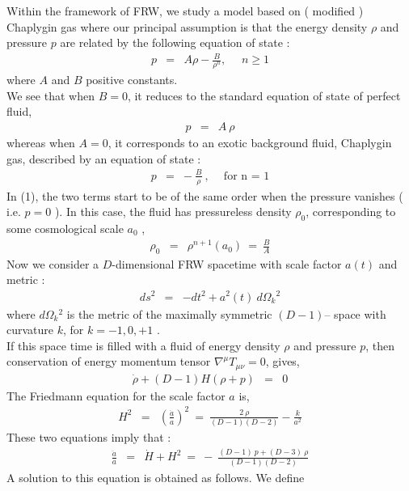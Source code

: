 \documentclass[a4paper,12pt,a4]{article}
\begin{document}
Within the framework of FRW, we study a model based on ( modified ) 
Chaplygin gas where our principal assumption is that the energy density 
$\rho$ and pressure $p$ are related by the following equation of 
state :  
\begin{eqnarray}
p & = & A \rho - \frac{B}{\rho^n} ,~~~~~~n \geq 1  
\end{eqnarray}
where  $A$ and $B$ positive constants. \\  
We see that when $B = 0$, it reduces to the standard equation of state 
of perfect fluid, 
\begin{eqnarray}
p & = & A~ \rho 
\end{eqnarray}
whereas when $A = 0$, it corresponds to an exotic background fluid, 
Chaplygin gas, described by an equation of state : 
\begin{eqnarray}
p & = & -~ \frac{B}{\rho}~,~~~~\mbox{ for n = 1} 
\end{eqnarray}
In (1), the two terms start to be of the same order when the pressure 
vanishes ( i.e. $p = 0$ ). In this case, the fluid has pressureless 
density $\rho_0$, corresponding to some cosmological scale $a_0$ , 
\begin{eqnarray}
\rho_0 & = & \rho^{n+1} ( a_0 )~=~ \frac{B}{A} 
\end{eqnarray}
Now we consider a $D$-dimensional FRW spacetime with scale factor $a(t)$ 
and metric :
\begin{eqnarray}
d s^2 & = & - d t^2 + a{^2}(t)~ d \Omega_k{^2}
\end{eqnarray} 
where $d \Omega_k{^2}$ is the metric of the maximally symmetric $( D - 1)$--
space with curvature $k$, for $k = -1,0, +1$ . \\  
If this space time is filled with a fluid of energy density $\rho$ and 
pressure $p$, then conservation of energy momentum tensor 
$\nabla^{\mu} T_{\mu \nu} = 0$, gives, 
\begin{eqnarray} 
\dot \rho + (D-1) H ( \rho + p ) & = & 0 
\end{eqnarray}   
The Friedmann equation for the scale factor $a$ is, 
\begin{eqnarray}
H^2 & = & \left( \frac{\dot{a}}{a} \right)^2~ =~ 
\frac{2~\rho}{(D-1) (D-2)} - \frac{k}{a^2} 
\end{eqnarray}
These two equations imply that :
\begin{eqnarray}
\frac{\ddot{a}}{a} & = & \dot{H} + H^2~ =~ -~
\frac{(D-1)~p + (D-3)~\rho}{(D-1)(D-2)} 
\end{eqnarray}
A solution to this equation is obtained as follows. We define 
\end{document}

